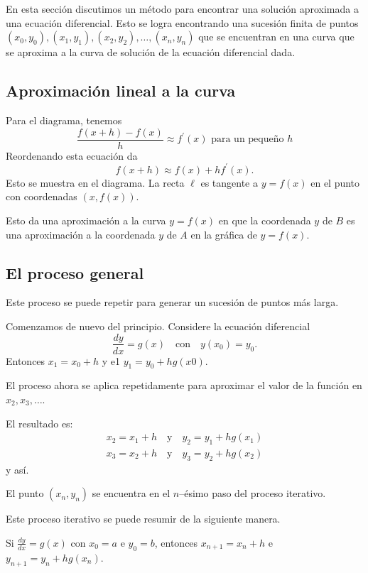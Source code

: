 \begin{example}
\end{example}

En esta sección discutimos un método para encontrar una solución aproximada a una ecuación diferencial. Esto se logra encontrando una sucesión finita de puntos $(x_{0},y_{0}),(x_{1},y_{1}),(x_{2},y_{2}),\ldots,(x_{n},y_{n})$ que se encuentran en una curva que se aproxima a la curva de solución de la ecuación diferencial dada.

\subsection{Aproximación lineal a la curva}
Para el diagrama, tenemos \[ \frac{f\left(x+h\right)-f\left(x\right)}{h}\approx f^{\prime}\left(x\right)\text{ para un pequeño }h \] Reordenando esta ecuación da \[ f\left(x+h\right)\approx f\left(x\right)+hf^{\prime}\left(x\right). \]
Esto se muestra en el diagrama. La recta $\ell$ es tangente a $y=f(x)$ en el punto con coordenadas $(x,f(x))$.

Esto da una aproximación a la curva $y=f(x)$ en que la coordenada $y$ de $B$ es una
aproximación a la coordenada $y$ de $A$ en la gráfica de $y=f(x)$.
\subsection{El proceso general}
Este proceso se puede repetir para generar un sucesión de puntos más larga.


Comenzamos de nuevo del principio. Considere la ecuación diferencial
\[ \frac{dy}{dx}=g\left(x\right)\quad\text{con}\quad y\left(x_{0}\right)=y_{0}. \]
Entonces $x_{1}=x_{0}+h$ y e1 $y_{1}=y_{0}+hg(x0)$.

El proceso ahora se aplica repetidamente para aproximar el valor de la función en $x_{2},x_{3},\ldots$.

El resultado es:
\begin{align*}
x_{2}=x_{1}+h\quad\text{y}\quad y_{2}=y_{1}+hg(x_{1})\\
x_{3}=x_{2}+h\quad\text{y}\quad y_{3}=y_{2}+hg(x_{2})
\end{align*}
y así.

El punto $\left(x_{n},y_{n}\right)$ se encuentra en el $n$--ésimo paso del proceso iterativo.

Este proceso iterativo se puede resumir de la siguiente manera.

\begin{theorem}
	Si $\frac{dy}{dx}=g\left(x\right)$ con $x_{0}=a$ e $y_{0}=b$, entonces $x_{n+1}=x_{n}+h$ e $y_{n+1}=y_{n}+hg\left(x_{n}\right)$.
\end{theorem}

